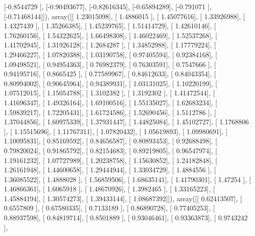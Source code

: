 \documentclass{article}
\begin{document}
       [-0.8544729 ],
       [-0.90493677],
       [-0.82616345],
       [-0.65894289],
       [-0.791071  ],
       [-0.71468144]]), array([[ 1.23015098],
       [ 1.4886015 ],
       [ 1.45077616],
       [ 1.33926988],
       [ 1.4327439 ],
       [ 1.35266385],
       [ 1.45239765],
       [ 1.51414729],
       [ 1.42610146],
       [ 1.76260156],
       [ 1.54322625],
       [ 1.66498308],
       [ 1.46022469],
       [ 1.52537268],
       [ 1.41702945],
       [ 1.31926128],
       [ 1.2684287 ],
       [ 1.34852988],
       [ 1.17779224],
       [ 1.29466227],
       [ 1.07820388],
       [ 1.03190758],
       [ 0.97405594],
       [ 0.92384168],
       [ 1.09498521],
       [ 0.94954363],
       [ 0.76982379],
       [ 0.76303591],
       [ 0.7547666 ],
       [ 0.94195716],
       [ 0.8665425 ],
       [ 0.77589967],
       [ 0.84612633],
       [ 0.84043354],
       [ 0.80994002],
       [ 0.90645964],
       [ 0.94389931],
       [ 1.03131025],
       [ 1.10220199],
       [ 1.07512015],
       [ 1.15054788],
       [ 1.3102382 ],
       [ 1.3192302 ],
       [ 1.41472544],
       [ 1.41696347],
       [ 1.49326164],
       [ 1.69100516],
       [ 1.55135027],
       [ 1.62683234],
       [ 1.59839217],
       [ 1.72205431],
       [ 1.61724586],
       [ 1.52690456],
       [ 1.5112786 ],
       [ 1.37044856],
       [ 1.60975339],
       [ 1.37931447],
       [ 1.44825084],
       [ 1.45102727],
       [ 1.1768806 ],
       [ 1.15515696],
       [ 1.11767311],
       [ 1.07820432],
       [ 1.05619893],
       [ 1.09980691],
       [ 1.10095831],
       [ 0.85169592],
       [ 0.84656587],
       [ 0.80893453],
       [ 0.92688498],
       [ 0.79820024],
       [ 0.91865792],
       [ 0.82154683],
       [ 0.89219805],
       [ 0.96547974],
       [ 1.19161232],
       [ 1.07727989],
       [ 1.20238758],
       [ 1.15630852],
       [ 1.24182848],
       [ 1.26161948],
       [ 1.44600658],
       [ 1.29444944],
       [ 1.33034729],
       [ 1.4884556 ],
       [ 1.36085522],
       [ 1.4888028 ],
       [ 1.56859506],
       [ 1.68635141],
       [ 1.41790301],
       [ 1.47254   ],
       [ 1.46866361],
       [ 1.6065918 ],
       [ 1.48670926],
       [ 1.3982465 ],
       [ 1.33165223],
       [ 1.45884194],
       [ 1.30574273],
       [ 1.39433144],
       [ 1.08687392]]), array([[ 0.62413507],
       [ 0.6557809 ],
       [ 0.67580335],
       [ 0.7133189 ],
       [ 0.86890728],
       [ 0.77405253],
       [ 0.88937598],
       [ 0.84819714],
       [ 0.8501889 ],
       [ 0.93046461],
       [ 0.93363873],
       [ 0.9743242 ],
\end{document}
